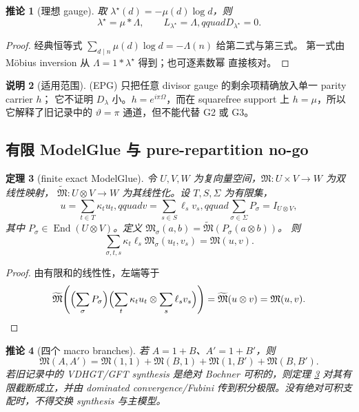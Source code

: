 \documentclass[11pt,a4paper]{ctexart}
\newtheorem{theorem}{定理}[section]
\newtheorem{corollary}[theorem]{推论}
\theoremstyle{definition}
\newtheorem{remark}[theorem]{说明}
\newcommand{\1}{\mathbf 1}
\begin{document}
\begin{corollary}[理想 gauge]
取 $\lambda^\star(d)=-\mu(d)\log d$，则
\[
\lambda^\star=\mu*\Lambda,\qquad
L_{\lambda^\star}=\Lambda,qquad D_{\lambda^\star}=0. \tag{EPG.2}
\]
\end{corollary}

\begin{proof}
经典恒等式 $\sum_{d\mid n}\mu(d)\log d=-\Lambda(n)$ 给第二式与第三式。
第一式由 Möbius inversion 从 $\Lambda=1*\lambda^\star$ 得到；也可逐素数幂
直接核对。
\end{proof}

\begin{remark}[适用范围]
(EPG) 只把任意 divisor gauge 的剩余项精确放入单一 parity carrier $h$；
它不证明 $D_\lambda$ 小。$h=e^{i\pi\Omega}$，而在 squarefree support 上
$h=\mu$，所以它解释了旧记录中的 $\vartheta=\pi$ 通道，但不能代替 G2 或 G3。
\end{remark}

\subsection{有限 ModelGlue 与 pure-repartition no-go}

\begin{theorem}[finite exact ModelGlue]\label{thm:modelglue-main}
令 $U,V,W$ 为复向量空间，$\mathfrak M:U\times V\to W$ 为双线性映射，
$\widetilde{\mathfrak M}:U\otimes V\to W$ 为其线性化。设 $T,S,\Sigma$ 为有限集，
\[
u=\sum_{t\in T}\kappa_tu_t,qquad
v=\sum_{s\in S}\ell_sv_s,qquad
\sum_{\sigma\in\Sigma}P_\sigma=I_{U\otimes V},       \tag{MG.1}
\]
其中 $P_\sigma\in\operatorname{End}(U\otimes V)$。定义
$\mathfrak M_\sigma(a,b)=\widetilde{\mathfrak M}(P_\sigma(a\otimes b))$。
则
\[
\boxed{
\sum_{\sigma,t,s}\kappa_t\ell_s
\mathfrak M_\sigma(u_t,v_s)=\mathfrak M(u,v).}        \tag{MG}
\]
\end{theorem}

\begin{proof}
由有限和的线性性，左端等于
\[
\widetilde{\mathfrak M}\!\left(
\Bigl(\sum_\sigma P_\sigma\Bigr)
\Bigl(\sum_t\kappa_tu_t\otimes\sum_s\ell_sv_s\Bigr)
\right)
=\widetilde{\mathfrak M}(u\otimes v)=\mathfrak M(u,v).
\]
\end{proof}

\begin{corollary}[四个 macro branches]
若 $A=1+B$、$A'=1+B'$，则
\[
\mathfrak M(A,A')=\mathfrak M(1,1)+\mathfrak M(B,1)
+\mathfrak M(1,B')+\mathfrak M(B,B').                 \tag{MG.2}
\]
若旧记录中的 VDHGT/GFT synthesis 是绝对 Bochner 可积的，则定理
\ref{thm:modelglue-main} 对其有限截断成立，并由 dominated convergence/Fubini
传到积分极限。没有绝对可积支配时，不得交换 synthesis 与主模型。
\end{corollary}
\end{document}

